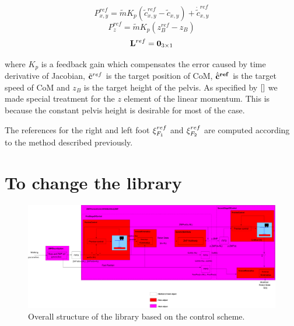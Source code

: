 \begin{equation}
P^{ref}_{x,y} = \tilde{m}K_p (\tilde{c}_{x,y}^{ref} - \tilde{c}_{x,y} )+ \dot{\tilde{c}}^{ref}_{x,y}
\label{eq:XYLinearMomentum}
\end{equation}
\begin{equation}
P^{ref}_{z} = \tilde{m} K_p (z_B^{ref} - z_B)
\label{eq:ZLinearMomentum}
\end{equation}
\begin{equation}
{\bf L}^{ref} = {\bf 0}_{3 \times 1}
\end{equation}

where $K_p$ is a feedback gain which compensates the error caused by time derivative of Jacobian,
$\tilde{\bf c}^{ref}$ is the target position of CoM, $\dot{\tilde{\bf c}}^{ref}$ is the target
speed of CoM and $z_B$ is the target height of the pelvis. As specified by $\cite{}$
we made special treatment for the $z$ element of the linear momentum. This is because the constant
pelvis height is desirable for most of the case.
\par
The references for the right and left foot ${\bf \xi}^{ref}_{F_1}$ and ${\bf \xi}^{ref}_{F_2}$
are computed according to the method described previously.


\section{To change the library}

\begin{figure}[htb]
\begin{center}
\includegraphics[angle=270,width=0.7\linewidth]{./figures/PatternGenerator/ZMPSchemeSoftware}
\caption{Overall structure of the library based on the control scheme.}
\label{pic:OverallStructure}
\end{center}
\end{figure}

